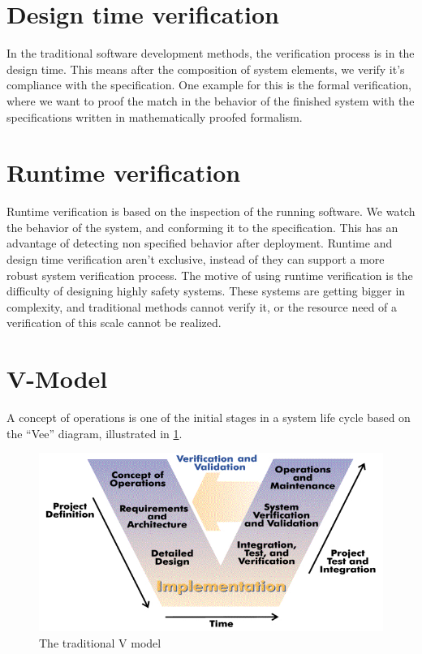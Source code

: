 \section*{Design time verification}

In the traditional software development methods, the verification process is in the design time. This means after the composition of system elements, we verify it's compliance with the specification. One example for this is the formal verification, where we want to proof the match in the behavior of the finished system with the specifications written in mathematically proofed formalism.

\section*{Runtime verification}

Runtime verification is based on the inspection of the running software. We watch the behavior of the system, and conforming it to the specification. This has an advantage of detecting non specified behavior after deployment. Runtime and design time verification aren't exclusive, instead of they can support a more robust system verification process. The motive of using runtime verification is the difficulty of designing highly safety systems. These systems are getting bigger in complexity, and traditional methods cannot verify it, or the resource need of a verification of this scale cannot be realized.

\section*{V-Model}

A concept of operations is one of the initial stages in a system life cycle based on the “Vee” diagram, illustrated in \cref{fig:intro:vmodel}.

\begin{figure}[h]
	\centering
	\includegraphics[width=0.8\linewidth]{include/figures/chapter_1/VModel}
	\caption{The traditional V model \cite{vmodel}}
	\label{fig:intro:vmodel}
\end{figure}

